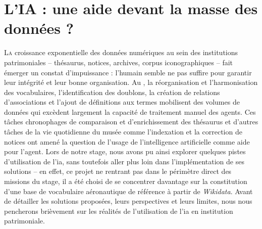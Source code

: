 \chapter[Apports de l'\ac{ia}]{\label{III-C}L'IA : une aide devant la masse des données ?}

\lettrine{L}a croissance exponentielle des données numériques au sein des institutions patrimoniales -- thésaurus, notices, archives, corpus iconographiques -- fait émerger un constat d’impuissance : l’humain semble ne pas suffire pour garantir leur intégrité et leur bonne organisation. Au \mae, la réorganisation et l'harmonisation des vocabulaires, l’identification des doublons, la création de relations d'associations et l'ajout de définitions aux termes mobilisent des volumes de données qui excèdent largement la capacité de traitement manuel des agents. Ces tâches chronophages de comparaison et d'enrichissement des thésaurus et d'autres tâches de la vie quotidienne du musée comme l'indexation et la correction de notices ont amené la question de l'usage de l'intelligence artificielle comme aide pour l'agent. Lors de notre stage, nous avons pu ainsi explorer quelques pistes d'utilisation de l'\ac{ia}, sans toutefois aller plus loin dans l'implémentation de ses solutions -- en effet, ce projet ne rentrant pas dans le périmètre direct des missions du stage, il a été choisi de se concentrer davantage sur la constitution d'une base de vocabulaire aéronautique de référence à partir de \textit{Wikidata}. Avant de détailler les solutions proposées, leurs perspectives et leurs limites, nous nous pencherons brièvement sur les réalités de l'utilisation de l'\ac{ia} en institution patrimoniale.  








\bigskip
\bigskip
\bigskip

